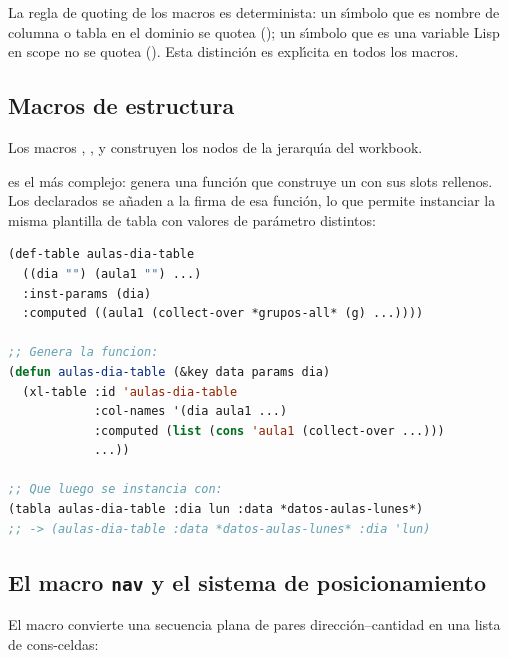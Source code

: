 La regla de quoting de los macros es determinista: un s\'{\i}mbolo que es
nombre de columna o tabla en el dominio se quotea (); un
s\'{\i}mbolo que es una variable Lisp en scope no se quotea ().
Esta distinci\'on es expl\'{\i}cita en todos los macros.

\subsection{Macros de estructura}
\label{ssec:macros-estructura}

Los macros , ,  y 
construyen los nodos de la jerarqu\'{\i}a del workbook.

 es el m\'as complejo: genera una funci\'on que construye
un  con sus slots rellenos.  Los  declarados
se a\~naden a la firma de esa funci\'on, lo que permite instanciar la misma
plantilla de tabla con valores de par\'ametro distintos:

\begin{lstlisting}[language=CommonLisp,
  caption={Expansi\'on simplificada de def-table.}]
(def-table aulas-dia-table
  ((dia "") (aula1 "") ...)
  :inst-params (dia)
  :computed ((aula1 (collect-over *grupos-all* (g) ...))))

;; Genera la funcion:
(defun aulas-dia-table (&key data params dia)
  (xl-table :id 'aulas-dia-table
            :col-names '(dia aula1 ...)
            :computed (list (cons 'aula1 (collect-over ...)))
            ...))

;; Que luego se instancia con:
(tabla aulas-dia-table :dia lun :data *datos-aulas-lunes*)
;; -> (aulas-dia-table :data *datos-aulas-lunes* :dia 'lun)
\end{lstlisting}

\subsection{El macro \texttt{nav} y el sistema de posicionamiento}
\label{ssec:macro-nav}

El macro  convierte una secuencia plana de pares direcci\'on--cantidad
en una lista de cons-celdas:

